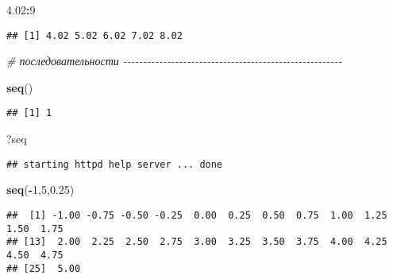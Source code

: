 \documentclass[
]{article}
\newenvironment{Shaded}{\begin{snugshade}}{\end{snugshade}}
\newcommand{\CommentTok}[1]{\textcolor[rgb]{0.56,0.35,0.01}{\textit{#1}}}
\newcommand{\DecValTok}[1]{\textcolor[rgb]{0.00,0.00,0.81}{#1}}
\newcommand{\FloatTok}[1]{\textcolor[rgb]{0.00,0.00,0.81}{#1}}
\newcommand{\FunctionTok}[1]{\textcolor[rgb]{0.13,0.29,0.53}{\textbf{#1}}}
\newcommand{\NormalTok}[1]{#1}
\newcommand{\SpecialCharTok}[1]{\textcolor[rgb]{0.81,0.36,0.00}{\textbf{#1}}}
\begin{document}
\begin{Shaded}
\begin{Highlighting}[]
\FloatTok{4.02}\SpecialCharTok{:}\DecValTok{9}
\end{Highlighting}
\end{Shaded}

\begin{verbatim}
## [1] 4.02 5.02 6.02 7.02 8.02
\end{verbatim}

\begin{Shaded}
\begin{Highlighting}[]
\CommentTok{\# последовательности {-}{-}{-}{-}{-}{-}{-}{-}{-}{-}{-}{-}{-}{-}{-}{-}{-}{-}{-}{-}{-}{-}{-}{-}{-}{-}{-}{-}{-}{-}{-}{-}{-}{-}{-}{-}{-}{-}{-}{-}{-}{-}{-}{-}{-}{-}{-}{-}{-}{-}{-}{-}{-}{-}{-}}

\FunctionTok{seq}\NormalTok{()}
\end{Highlighting}
\end{Shaded}

\begin{verbatim}
## [1] 1
\end{verbatim}

\begin{Shaded}
\begin{Highlighting}[]
\NormalTok{?seq}
\end{Highlighting}
\end{Shaded}

\begin{verbatim}
## starting httpd help server ... done
\end{verbatim}

\begin{Shaded}
\begin{Highlighting}[]
\FunctionTok{seq}\NormalTok{(}\SpecialCharTok{{-}}\DecValTok{1}\NormalTok{,}\DecValTok{5}\NormalTok{,}\FloatTok{0.25}\NormalTok{)}
\end{Highlighting}
\end{Shaded}

\begin{verbatim}
##  [1] -1.00 -0.75 -0.50 -0.25  0.00  0.25  0.50  0.75  1.00  1.25  1.50  1.75
## [13]  2.00  2.25  2.50  2.75  3.00  3.25  3.50  3.75  4.00  4.25  4.50  4.75
## [25]  5.00
\end{verbatim}
\end{document}
